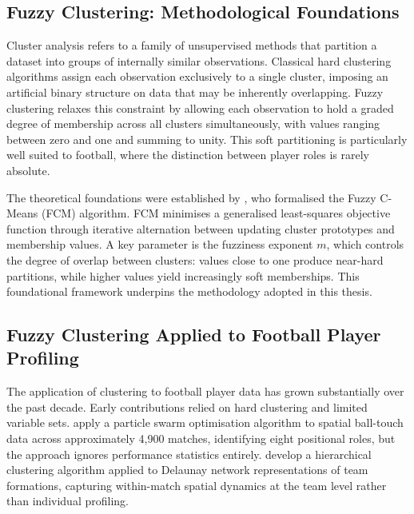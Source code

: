 \documentclass[a4paper,11pt]{report}
\begin{document}
\subsection{Fuzzy Clustering: Methodological Foundations}

Cluster analysis refers to a family of unsupervised methods that partition a dataset into groups of internally similar observations. Classical hard clustering algorithms assign each observation exclusively to a single cluster, imposing an artificial binary structure on data that may be inherently overlapping. Fuzzy clustering relaxes this constraint by allowing each observation to hold a graded degree of membership across all clusters simultaneously, with values ranging between zero and one and summing to unity. This soft partitioning is particularly well suited to football, where the distinction between player roles is rarely absolute.

The theoretical foundations were established by \cite{bezdek1984fcm}, who formalised the Fuzzy C-Means (FCM) algorithm. FCM minimises a generalised least-squares objective function through iterative alternation between updating cluster prototypes and membership values. A key parameter is the fuzziness exponent $m$, which controls the degree of overlap between clusters: values close to one produce near-hard partitions, while higher values yield increasingly soft memberships. This foundational framework underpins the methodology adopted in this thesis.

\subsection{Fuzzy Clustering Applied to Football Player Profiling}

The application of clustering to football player data has grown substantially over the past decade. Early contributions relied on hard clustering and limited variable sets. \cite{behravan2019finding} apply a particle swarm optimisation algorithm to spatial ball-touch data across approximately 4,900 matches, identifying eight positional roles, but the approach ignores performance statistics entirely. \cite{narizuka2019clustering} develop a hierarchical clustering algorithm applied to Delaunay network representations of team formations, capturing within-match spatial dynamics at the team level rather than individual profiling.
\end{document}
